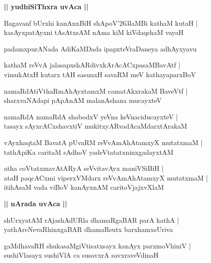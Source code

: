 \documentclass[twoside,12pt,openright]{book}
\def\S{\char'263}
\newcounter{shloka}[chapter]
\def\uvaca#1{\centerline{{\large\textbf{#1}}}}
\begin{document}
\uvaca{|| yudhiSiThxra uvAca ||}

\begin{shloka}
Bagavanf bUrxhi kanAnxBiH shApoV\S laMBi kathaM kutaH |\\
kasAyxpatAyxni tAsAtxsAM nAma kiM kiVdaqshaM vayaH
\end{shloka}

\begin{center}
padamxpurANada AdiKaMDada ipapxteVraDaneya adhAyxyavu
\end{center}

\begin{shloka}
kathaM reVvA jalasapxshARdivxkArAcACxpasaMBavAtf |\\
vimukAtxH kutarx tAH sasunxH savaRM meV kathayaparxBoV
\end{shloka}

\begin{shloka}
namaRdAtiVthaRmAhAyxtamxM camatAkxrakaM BaveVtf |\\
sharxvaNAdapi pApAnAM malanAshana mucayxteV 
\end{shloka}

\begin{shloka}
namaRdA namaRdA shabodxV yeVna keVnaciducayxteV |\\
tasayx sAyxcACxshavxtiV mukitxyARvadAcaMdarxtArakaM 
\end{shloka}

\begin{shloka}
vAyxhaqtaM BavatA pUvaRM reVvAmAhAtamxyX mutatxmaM |\\
tathApiKa caritaM sAdhoV yadeVtatatxninxgadayxtAM 
\end{shloka}

\begin{shloka}
atha coVtatxmavAtARyA seVvitavAyx maniVSiBiH |\\
ataH paqcACxmi viperxVMdarx reVvAmAhAtamxyX mutatxmaM |\\
itihAsaM vada viBoV kanAyxnAM caritoVjajxvXlaM 
\end{shloka}

\uvaca{|| nArada uvAca ||}

\begin{shloka}
shUrxyatAM rAjashAdURla dhamaRgaBAR parA kathA |\\
yathAreNevaRhinxgaBAR dhamaRsutx barxhamxsUriva
\end{shloka}

\begin{shloka}
gaMdhavaRH shukasaMgiVtisatxsayx kanAyx parxmoVhiniV |\\
sushiVlasayx sushiVlA ca susavxrA savxraveVdinaH 
\end{shloka}
\end{document}
